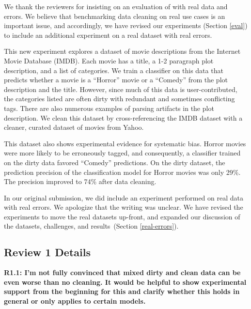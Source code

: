 \vspace{0.5em}

We thank the reviewers for insisting on an evaluation of \sys with real data and errors. We believe that benchmarking data cleaning on real use cases is an important issue, and accordingly, we have revised our experiments (Section \ref{eval}) to include an additional experiment on a real dataset with real errors. 

This new experiment explores a dataset of movie descriptions from the Internet Movie Database (IMDB). 
Each movie has a title, a 1-2 paragraph plot description, and a list of categories.
We train a classifier on this data that predicts whether a movie is a ``Horror'' movie or a ``Comedy'' from the plot description and the title.
However, since much of this data is user-contributed, the categories listed are often dirty with redundant and sometimes conflicting tags.
There are also numerous examples of parsing artifacts in the plot description.
We clean this dataset by cross-referencing the IMDB dataset with a cleaner, curated dataset of movies from Yahoo.

This dataset also shows experimental evidence for systematic bias.
Horror movies were more likely to be erroneously tagged, and consequently, a classifier trained on the dirty data favored ``Comedy'' predictions. 
On the dirty dataset, the prediction precision of the classification model for Horror movies was only 29\%.
The precision improved to 74\% after data cleaning.

In our original submission, we did include an experiment performed on real data with real errors. 
We apologize that the writing was unclear. We have revised the experiments to move the real datasets up-front, and expanded our discussion of the datasets, challenges, and results~(Section \ref{real-errors}).

\subsection*{Review 1 Details} 

\noindent\textbf{R1.1: I'm not fully convinced that mixed dirty and clean data can be even worse than no cleaning. It would be helpful to show experimental support from the beginning for this and clarify whether this holds in general or only applies to certain models.}

